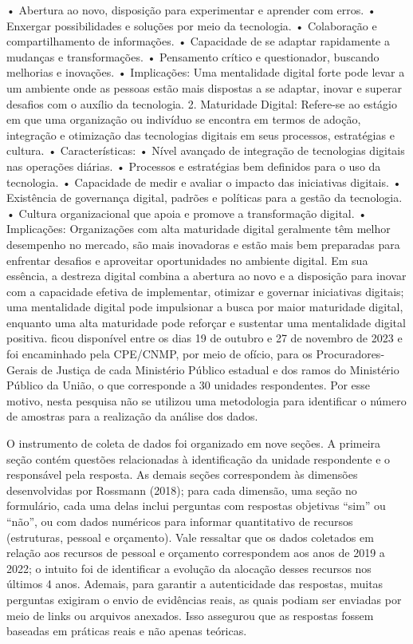 {• Abertura ao novo, disposição para experimentar e aprender com erros. • Enxergar possibilidades e soluções por meio da tecnologia. • Colaboração e compartilhamento de informações. • Capacidade de se adaptar rapidamente a mudanças e transformações. • Pensamento crítico e questionador, buscando melhorias e inovações. • Implicações: Uma mentalidade digital forte pode levar a um ambiente onde as pessoas estão mais dispostas a se adaptar, inovar e superar desafios com o auxílio da tecnologia. 2. Maturidade Digital: Refere-se ao estágio em que uma organização ou indivíduo se encontra em termos de adoção, integração e otimização das tecnologias digitais em seus processos, estratégias e cultura. • Características: • Nível avançado de integração de tecnologias digitais nas operações diárias. • Processos e estratégias bem definidos para o uso da tecnologia. • Capacidade de medir e avaliar o impacto das iniciativas digitais. • Existência de governança digital, padrões e políticas para a gestão da tecnologia. • Cultura organizacional que apoia e promove a transformação digital. • Implicações: Organizações com alta maturidade digital geralmente têm melhor desempenho no mercado, são mais inovadoras e estão mais bem preparadas para enfrentar desafios e aproveitar oportunidades no ambiente digital.  Em sua essência, a destreza digital combina a abertura ao novo e a disposição para inovar com a capacidade efetiva de implementar, otimizar e governar iniciativas digitais; uma mentalidade digital pode impulsionar a busca por maior maturidade digital, enquanto uma alta maturidade pode reforçar e sustentar uma mentalidade digital positiva.} ficou disponível entre os dias 19 de outubro e 27 de novembro de 2023 e foi encaminhado pela CPE/CNMP, por meio de ofício, para os Procuradores-Gerais de Justiça de cada Ministério Público estadual e dos ramos do Ministério Público da União, o que corresponde a 30 unidades respondentes. Por esse motivo, nesta pesquisa não se utilizou uma metodologia para identificar o número de amostras para a realização da análise dos dados.

O instrumento de coleta de dados foi organizado em nove seções. A primeira seção contém questões relacionadas à identificação da unidade respondente e o responsável pela resposta. As demais seções correspondem às dimensões desenvolvidas por Rossmann (2018); para cada dimensão, uma seção no formulário, cada uma delas inclui perguntas com respostas objetivas “sim” ou “não”, ou com dados numéricos para informar quantitativo de recursos (estruturas, pessoal e orçamento). Vale ressaltar que os dados coletados em relação aos recursos de pessoal e orçamento correspondem aos anos de 2019 a 2022; o intuito foi de identificar a evolução da alocação desses recursos nos últimos 4 anos. Ademais, para garantir a autenticidade das respostas, muitas perguntas exigiram o envio de evidências reais, as quais podiam ser enviadas por meio de links ou arquivos anexados. Isso assegurou que as respostas fossem baseadas em práticas reais e não apenas teóricas.

